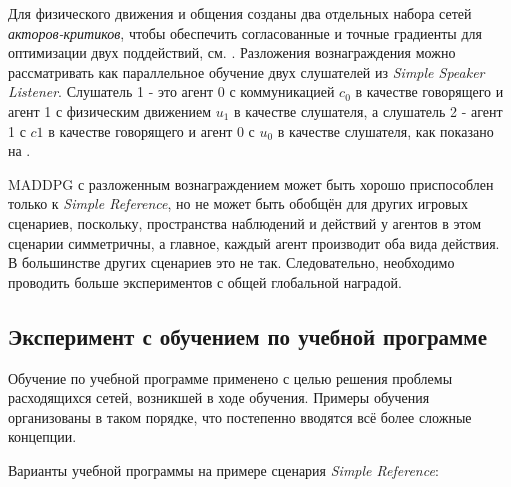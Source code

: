 Для физического движения и общения созданы два отдельных набора сетей \textit{акторов-критиков}, чтобы обеспечить согласованные и точные градиенты для оптимизации двух поддействий, см. . Разложения вознаграждения можно рассматривать как параллельное обучение двух слушателей из \textit{Simple Speaker Listener}. Слушатель 1 - это агент 0 с коммуникацией $c_0$ в качестве говорящего и агент 1 с физическим движением $u_1$ в качестве слушателя, а слушатель 2 - агент 1 с $c1$ в качестве говорящего и агент 0 с $u_0$ в качестве слушателя, как показано на .

MADDPG с разложенным вознаграждением может быть хорошо приспособлен только к \textit{Simple Reference}, но не может быть обобщён для других игровых сценариев, поскольку, пространства наблюдений и действий у агентов в этом сценарии симметричны, а главное, каждый агент производит оба вида действия. В большинстве других сценариев это не так. Следовательно, необходимо проводить больше экспериментов с общей глобальной наградой.

\subsection{Эксперимент с обучением по учебной программе}

Обучение по учебной программе применено с целью решения проблемы расходящихся сетей, возникшей в ходе обучения. Примеры обучения организованы в таком порядке, что постепенно вводятся всё более сложные концепции.

Варианты учебной программы на примере сценария \textit{Simple Reference}:

